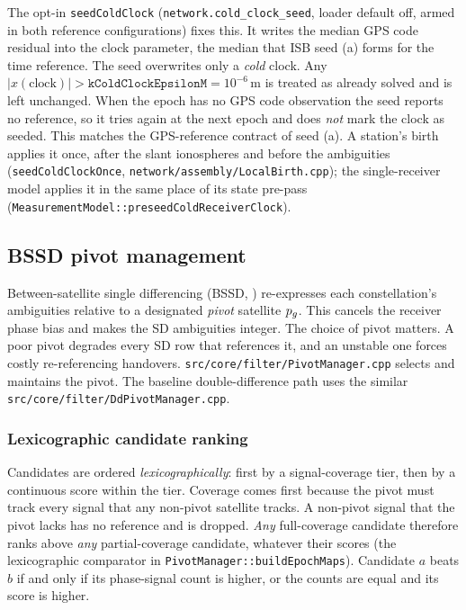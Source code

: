 \documentclass[main.tex]{subfiles}
\begin{document}
The opt-in \texttt{seedColdClock}
(\texttt{network.cold\_clock\_seed}, loader default off, armed in both
reference configurations) fixes this.  It writes
the median GPS code residual into the clock parameter, the median that ISB
seed (a) forms for the time reference.  The seed
overwrites only a \emph{cold} clock.  Any
$\lvert x(\mathrm{clock})\rvert > \texttt{kColdClockEpsilonM} = 10^{-6}\,\mathrm{m}$
is treated as already solved and is left unchanged.  When the epoch has
no GPS code observation the seed reports no reference, so it tries
again at the next epoch and does \emph{not} mark the clock as seeded.
This matches the GPS-reference contract of seed (a).  A station's birth
applies it once, after the slant ionospheres and before the ambiguities
(\texttt{seedColdClockOnce}, \texttt{network/assembly/LocalBirth.cpp}); the
single-receiver model applies it in the same place of its state pre-pass
(\texttt{MeasurementModel::preseedColdReceiverClock}).

\subsection{BSSD pivot management}
\label{sec:estinfra-pivot}

Between-satellite single differencing (BSSD, ) re-expresses each constellation's ambiguities relative to a
designated \emph{pivot} satellite $p_{g}$.  This cancels the receiver
phase bias and makes the SD ambiguities integer.  The choice of pivot
matters.  A poor pivot degrades every SD row that references it, and an
unstable one forces costly re-referencing handovers.
\texttt{src/core/filter/PivotManager.cpp} selects and maintains the
pivot.  The baseline double-difference path uses the similar
\texttt{src/core/filter/DdPivotManager.cpp}.

\subsubsection{Lexicographic candidate ranking}
\label{sec:estinfra-pivot-rank}

Candidates are ordered \emph{lexicographically}: first by a
signal-coverage tier, then by a continuous score within the tier.
Coverage comes first because the pivot must track every signal that any
non-pivot satellite tracks.  A non-pivot signal that the pivot lacks has
no reference and is dropped.  \emph{Any} full-coverage candidate
therefore ranks above \emph{any} partial-coverage candidate, whatever
their scores (the lexicographic comparator in
\texttt{PivotManager::buildEpochMaps}).  Candidate $a$ beats $b$ if and
only if its phase-signal count is higher, or the counts are equal and
its score is higher.
\end{document}
